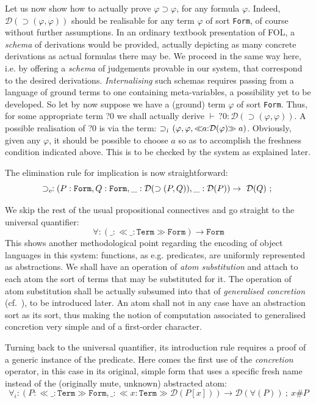 \documentclass[11pt,a4paper]{amsart}
\newcounter{s}
\newcommand{\absort}[2]{\ensuremath{\ll\!\!#1\!\!\gg #2}}
\newcommand{\dabsterm}[3]{\ensuremath{\ll\!\!\ntyping{#1}{#2}\!\!\gg #3}}
\newcommand{\typing}[2]{\ensuremath{#1 : #2}}
\newcommand{\ntyping}[2]{\ensuremath{#1{:}#2}}
\newcommand{\fresh}[2]{#1 \# #2}
\newcommand{\fconstrdecl}[4]{\ensuremath{#1 : #2 \rightarrow\ #3\ ;\ #4}}
\newcommand{\tyjdgmnts}[2]{\ensuremath{\vdash \typing{#1}{#2}}}
\newcommand{\cnst}[1]{\textsl{#1}}
\newcommand{\form}{\texttt{Form}}
\newcommand{\prf}{\ensuremath{\mathcal{D}}}
\newcommand{\impl}{\ensuremath{\supset}}
\newcommand{\Trm}{\texttt{Term}}
\newcommand{\Frm}{\texttt{Form}}
\begin{document}
Let us now show how to actually prove $\varphi \impl \varphi$, for any formula $\varphi$. Indeed, $\prf(\impl(\varphi,\varphi))$ should be realisable for any term $\varphi$ of sort \form, of course without further assumptions. In an ordinary textbook presentation of FOL, a \emph{schema} of derivations would be provided, actually depicting as many concrete derivations as actual formulas there may be. 
We proceed in the same way here, i.e. by offering a \emph{schema} of judgements provable in our system, that correspond to the desired derivations. 
\emph{Internalising} such schemas requires passing from a language of ground terms to one containing meta-variables, a possibility yet to be developed. So let by now suppose we have a (ground) term $\varphi$ of sort \Frm.
Thus,  for some appropriate term ?0 we shall actually derive $\tyjdgmnts{\,?0}{\prf(\impl(\varphi,\varphi))}$.
A possible realisation of ?0 is via the term: $ \impl_{\cnst{i}}\, (\varphi, \varphi, \dabsterm{a}{\prf(\varphi)}{a})$.
Obviously, given any $\varphi$, it should be possible to choose $a$ so as to accomplish the freshness condition indicated above. This is to be checked by the system as explained later.

The elimination rule for implication is now straightforward:
\[\fconstrdecl{\impl_{\cnst{e}}}{(\typing{P}{\form}, \typing{Q}{\form},
    \typing{\_}{\prf(\impl(P, Q))}, \typing{\_}{\prf(P))}}{\prf(Q)}{}\]

\noindent We skip the rest of the usual propositional connectives and go straight to the universal quantifier:
\[
  \forall : (\_ : \absort{\_:\Trm}\Frm) \rightarrow \Frm
\]
This shows another methodological point regarding the encoding of object languages in this system: functions, as e.g. predicates, are uniformly represented as abstractions. We shall have an operation of \emph{atom substitution} and attach to each atom the sort of terms that may be substituted for it. The operation of atom substitution shall be actually subsumed into that of \emph{generalised concretion} (cf.~\cite{pitts:nomlfo-jv}), to be introduced later. An atom shall not in any case have an abstraction sort as its sort, thus making the notion of computation associated to generalised concretion very simple and of a first-order character.

Turning back to the universal quantifier, its introduction  rule requires a proof of a generic instance of the
predicate. Here comes the first use of the 
\emph{concretion} operator, in this case in its original, simple form 
that uses a specific fresh  name instead of the (originally
mute, unknown) abstracted atom:
\[
\forall_i  : (P : \absort{\_{:}\Trm}{\Frm},\_ :\absort{x{:}\Trm}{\prf(P[x])}) \to \prf(\forall (P)) \ ; \ \fresh{x}{P}
\]
\end{document}

